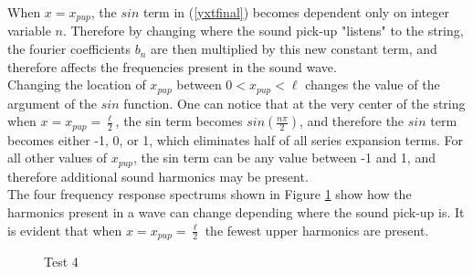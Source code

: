 \documentclass[%
 reprint,
 amsmath,amssymb,
 aps,
]{revtex4-1}
\begin{document}
When $x = x_{pup}$, the $sin$ term in (\ref{yxtfinal}) becomes dependent only on integer variable $n$. Therefore by changing where the sound pick-up "listens" to the string, the fourier coefficients $b_n$ are then multiplied by this new constant term, and therefore affects the frequencies present in the sound wave. \\

Changing the location of $x_{pup}$ between $ 0 < x_{pup} <\ell$ changes the value of the argument of the $sin$ function. One can notice that at the very center of the string when $x = x_{pup} = \frac{\ell}{2}$, the sin term becomes $sin(\frac{n \pi}{2})$, and therefore the $sin$ term becomes either -1, 0, or 1, which eliminates half of all series expansion terms. For all other values of $x_{pup}$, the sin term can be any value between -1 and 1, and therefore additional sound harmonics may be present.\\

The four frequency response spectrums shown in Figure \ref{Test4} show how the harmonics present in a wave can change depending where the sound pick-up is. It is evident that when $x = x_{pup} = \frac{\ell}{2}$ the fewest upper harmonics are present.
 
\begin{figure}[h]
\caption{Test 4}
\label{Test4}
\end{figure}
\end{document}

